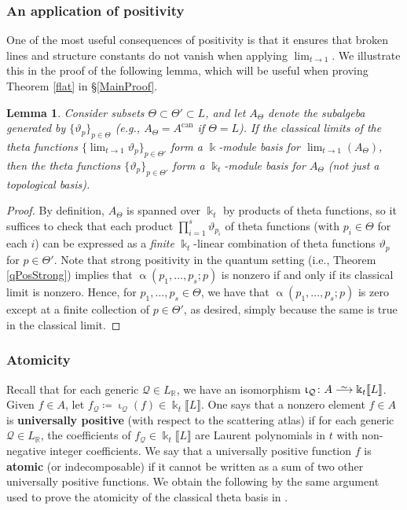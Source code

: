 \documentclass{amsart}
\DeclareMathOperator{\can}{can}
\let\llb=\llbracket
\let\rrb=\rrbracket
\let\bb=\mathbb
\let\rar=\rightarrow
\def\risom{\buildrel\sim\over{\smashedlongrightarrow}}
\def\smashedlongrightarrow{\setbox0=\hbox{$\longrightarrow$}\ht0=1.25pt\box0}
\newcommand {\kk} {\Bbbk}
\newcommand {\kt} {\kk_t}
\newcommand {\sQ} {\mathcal{Q}}
\renewcommand{\iota}{\upiota}
\renewcommand{\alpha}{\upalpha}
\theoremstyle{plain}%
\newtheorem{lem}[thm]{Lemma}
\theoremstyle{definition}
\theoremstyle{remark}
\begin{document}
\subsubsection{An application of positivity}

One of the most useful consequences of positivity is that it ensures that broken lines and structure constants do not vanish when applying $\lim_{t\rar 1}$.  We illustrate this in the proof of the following lemma, which will be useful when proving Theorem \ref{flat} in \S \ref{MainProof}.
\begin{lem}\label{Thetaprime}
Consider subsets $\Theta\subset \Theta'\subset L$, and let $A_{\Theta}$ denote the subalgeba generated by $\{\vartheta_p\}_{p\in \Theta}$ (e.g., $A_{\Theta}=A^{\can}$ if $\Theta=L$).  If the classical limits of the theta functions $\{\lim_{t\rar 1} \vartheta_p\}_{p\in \Theta'}$ form a $\kk$-module basis for $\lim_{t\rar 1}(A_{\Theta})$, then the theta functions $\{\vartheta_p\}_{p\in \Theta'}$ form a $\kt$-module basis for $A_{\Theta}$ (not just a topological basis).
\end{lem}
\begin{proof}
By definition, $A_{\Theta}$ is spanned over $\kt$ by products of theta functions, so it suffices to check that each product $\prod_{i=1}^s \vartheta_{p_i}$ of theta functions (with $p_i\in \Theta$ for each $i$) can be expressed as a \textit{finite} $\kt$-linear combination of theta functions $\vartheta_p$ for $p\in \Theta'$. Note that strong positivity in the quantum setting (i.e., Theorem \ref{qPosStrong}) implies that $\alpha(p_1,\ldots,p_s;p)$ is nonzero if and only if its classical limit is nonzero.  Hence, for $p_1,\ldots,p_s\in \Theta$, we have that $\alpha(p_1,\ldots,p_s;p)$ is zero except at a finite collection of $p\in \Theta'$, as desired, simply because the same is true in the classical limit.
\end{proof}

\subsubsection{Atomicity}

Recall that for each generic $\sQ\in L_{\bb{R}}$, we have an isomorphism $\iota_{\sQ}\colon A\risom  \kk_t\llb L\rrb$.  Given $f\in A$, let $f_{\sQ}\coloneqq \iota_{\sQ}(f)\in \kk_t\llb L\rrb$.  One says that a nonzero element $f\in A$ is \textbf{universally positive} (with respect to the scattering atlas) if for each generic $\sQ\in L_{\bb{R}}$, the coefficients of $f_{\sQ}\in \kk_t\llb L\rrb$ are Laurent polynomials in $t$ with non-negative integer coefficients.  We say that a universally positive function $f$ is \textbf{atomic} (or indecomposable) if it cannot be written as a sum of two other universally positive functions.  We obtain the following by the same argument used to prove the atomicity of the classical theta basis in \cite[Thm. 1]{ManAtomic}.
\end{document}
